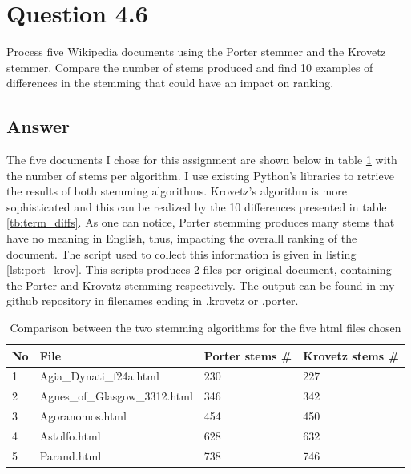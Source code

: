 \documentclass{article}
\begin{document}
		
		
		\section*{Question 4.6}
		Process five Wikipedia documents using the Porter stemmer and the Krovetz stemmer. Compare the number of stems produced and find 10 examples of differences in the stemming that could have an impact on ranking.
		\subsection*{Answer}
		The  five documents I chose for this assignment are shown below in table \ref{tb:html_files} with the number of stems per algorithm. 	I use existing Python's libraries to retrieve the results of both stemming algorithms. Krovetz's algorithm is more sophisticated and this can be realized by the 10 differences presented in table \ref{tb:term_diffs}. As one can notice, Porter stemming produces many stems that have no meaning in English, thus, impacting the overalll ranking of the document. The script used to collect this information is given in listing \ref{lst:port_krov}. This scripts produces 2 files per original document, containing the Porter and Krovatz stemming respectively. The output can be found in my github repository in filenames ending in .krovetz or .porter.
		\begin{table}[]
			\centering
			\caption{Comparison between the two stemming algorithms for the five html files chosen}
			\label{tb:html_files}
			\begin{tabular}{|l|l|l|l|}
				\hline
				No & File                          & Porter stems \# & Krovetz stems \# \\ \hline
				1  & Agia\_Dynati\_f24a.html       & 230             & 227              \\ \hline
				2  & Agnes\_of\_Glasgow\_3312.html & 346             & 342              \\ \hline
				3  & Agoranomos.html               & 454             & 450              \\ \hline
				4  & Astolfo.html                  & 628             & 632              \\ \hline
				5  & Parand.html                   & 738             & 746              \\ \hline
			\end{tabular}
		\end{table}
\end{document}
